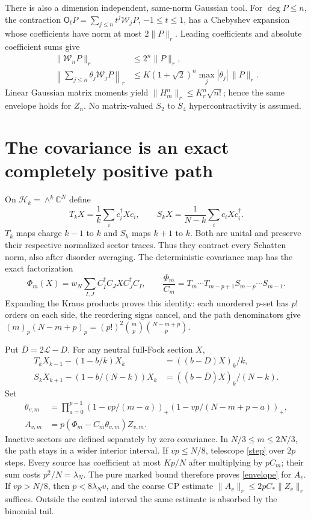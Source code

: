 \documentclass[11pt]{article}
\newcommand{\LL}{\mathcal L}
\newcommand{\WW}{\mathcal W}
\begin{document}
There is also a dimension independent, same-norm Gaussian tool.
For $\deg P\le n$, the contraction
$\mathsf O_tP=\sum_{j\le n}t^j\WW_jP$, $-1\le t\le1$, has a
Chebyshev expansion whose coefficients have norm at most $2\|P\|_r$.
Leading coefficients and absolute coefficient sums give
\begin{align}\label{topchaos}
 \|\WW_nP\|_r&\le2^n\|P\|_r,\\
 \left\|\sum_{j\le n}\theta_j\WW_jP\right\|_r
 &\le K(1+\sqrt2)^n\max_j|\theta_j|\,\|P\|_r.\label{chaos}
\end{align}
Linear Gaussian matrix moments \cite{Tropp} yield
$\|H_m^n\|_r\le K_r^n\sqrt{n!}$; hence the same envelope holds
for $Z_n$. No matrix-valued $S_2$ to $S_4$ hypercontractivity is assumed.

\newpage
\section{The covariance is an exact completely positive path}
On $\mathcal H_k=\wedge^k\mathbb C^N$ define
\begin{equation}
 T_kX=\frac1k\sum_i c_i^\dagger Xc_i,
 \qquad S_kX=\frac1{N-k}\sum_i c_iXc_i^\dagger.
\end{equation}
$T_k$ maps charge $k-1$ to $k$ and $S_k$ maps $k+1$ to $k$.
Both are unital and preserve their respective normalized sector
traces. Thus they contract every Schatten norm, also after disorder
averaging. The deterministic covariance map has the exact factorization
\begin{equation}\label{path}
 \Phi_m(X)=w_N\sum_{I,J} C_I^\dagger C_JX C_J^\dagger C_I,
 \qquad
 \frac{\Phi_m}{C_m}
 =T_m\cdots T_{m-p+1}S_{m-p}\cdots S_{m-1}.
\end{equation}
Expanding the Kraus products proves this identity: each unordered
$p$-set has $p!$ orders on each side, the reordering signs cancel,
and the path denominators give
$(m)_p(N-m+p)_p=(p!)^2\binom mp\binom{N-m+p}p$.

Put $\bar D=2\LL-D$. For any neutral full-Fock section $X$,
\begin{align}\label{step}
 T_kX_{k-1}-(1-b/k)X_k&=((b-D)X)_k/k,\\
 S_kX_{k+1}-(1-b/(N-k))X_k&=((b-\bar D)X)_k/(N-k).
\end{align}
Set
\begin{align}
 \theta_{v,m}&=\prod_{a=0}^{p-1}
  (1-vp/(m-a))_+(1-vp/(N-m+p-a))_+,\\
 A_{v,m}&=p(\Phi_m-C_m\theta_{v,m})Z_{v,m}.
\end{align}
Inactive sectors are defined separately by zero covariance. In
$N/3\le m\le2N/3$, the path stays in a wider interior interval.
If $vp\le N/8$, telescope \eqref{step} over $2p$ steps. Every
source has coefficient at most $Kp/N$ after multiplying by $pC_m$;
their sum costs $p^2/N=\lambda_N$. The pure marked bound therefore
proves \eqref{envelope} for $A_v$. If $vp>N/8$, then
$p<8\lambda_Nv$, and the coarse CP estimate
$\|A_v\|_r\le2pC_*\|Z_v\|_r$ suffices. Outside the central
interval the same estimate is absorbed by the binomial tail.
\end{document}

